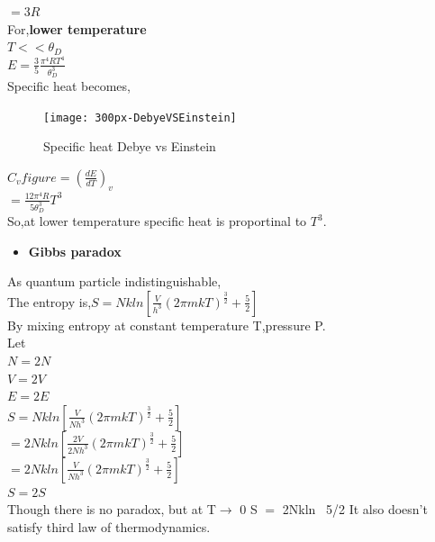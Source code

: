 \documentclass{article}
\newcommand*{\1}{\hspace{1pt}}
\begin{document}
  $ =3R$\\
  
For,\textbf{lower temperature}\\

$T<<\theta_D$\\

$E=\frac{3}{5}\frac{\pi^4RT^4}{\theta_D^3}$\\


Specific heat becomes,\\
\begin{figure}
    \centering
    \texttt{[image: 300px-DebyeVSEinstein]}
    \caption{Specific heat Debye vs Einstein}
    \label{fig:my_label}
\end{figure}
$C_vfigure=(\frac{dE}{dT})_v$\\


 $ = \frac{12\pi^4R}{5\theta_D^3}T^3$\\
 
 So,at lower temperature specific heat is proportinal to $T^3$.\\
 
 \begin{itemize}
     \item \textbf{Gibbs paradox}
 \end{itemize}
 
 As quantum particle indistinguishable,\\
 
 The entropy is,$S=Nkln[\frac{V}{h^3}(2\pi mkT)^{\frac{3}{2}}+\frac{5}{2}]$\\
 
 By mixing entropy at constant temperature T,pressure P.\\
 
 Let\\
 
 $N=2N$\\
 
 $V=2V$\\
 
 $E=2E$\\
 
 $S=Nkln[\frac{V}{Nh^3}(2\pi mkT)^{\frac{3}{2}}+\frac{5}{2}]$\\
 
 $= 2Nkln[\frac{2V}{2Nh^3}(2\pi mkT)^{\frac{3}{2}}+\frac{5}{2}]$\\
 
 $=   2Nkln[\frac{V}{Nh^3}(2\pi mkT)^{\frac{3}{2}}+\frac{5}{2}]$\\
 
 $S=2S$\\
 Though there is no paradox, but at T$\rightarrow$ 0 S $=$ 2Nkln \ 5/2
 It also doesn't satisfy third law of thermodynamics.  
 
\end{document}
